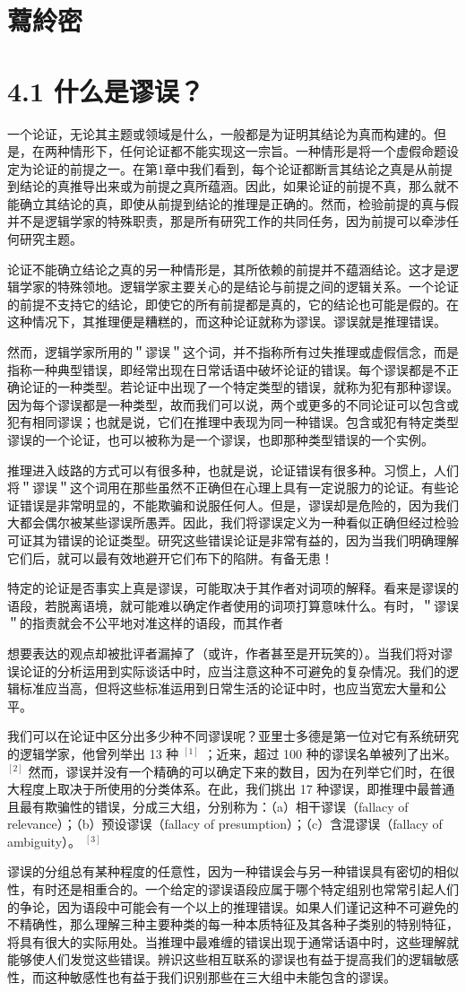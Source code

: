 \section*{藛紷密}
\section*{4.1 什么是谬误？}
一个论证，无论其主题或领域是什么，一般都是为证明其结论为真而构建的。但是，在两种情形下，任何论证都不能实现这一宗旨。一种情形是将一个虚假命题设定为论证的前提之一。在第1章中我们看到，每个论证都断言其结论之真是从前提到结论的真推导出来或为前提之真所蕴涵。因此，如果论证的前提不真，那么就不能确立其结论的真，即使从前提到结论的推理是正确的。然而，检验前提的真与假并不是逻辑学家的特殊职责，那是所有研究工作的共同任务，因为前提可以牵涉任何研究主题。

论证不能确立结论之真的另一种情形是，其所依赖的前提并不蕴涵结论。这才是逻辑学家的特殊领地。逻辑学家主要关心的是结论与前提之间的逻辑关系。一个论证的前提不支持它的结论，即使它的所有前提都是真的，它的结论也可能是假的。在这种情况下，其推理便是糟糕的，而这种论证就称为谬误。谬误就是推理错误。

然而，逻辑学家所用的＂谬误＂这个词，并不指称所有过失推理或虚假信念，而是指称一种典型错误，即经常出现在日常话语中破坏论证的错误。每个谬误都是不正确论证的一种类型。若论证中出现了一个特定类型的错误，就称为犯有那种谬误。因为每个谬误都是一种类型，故而我们可以说，两个或更多的不同论证可以包含或犯有相同谬误；也就是说，它们在推理中表现为同一种错误。包含或犯有特定类型谬误的一个论证，也可以被称为是一个谬误，也即那种类型错误的一个实例。

推理进入歧路的方式可以有很多种，也就是说，论证错误有很多种。习惯上，人们将＂谬误＂这个词用在那些虽然不正确但在心理上具有一定说服力的论证。有些论证错误是非常明显的，不能欺骗和说服任何人。但是，谬误却是危险的，因为我们大都会偶尔被某些谬误所愚弄。因此，我们将谬误定义为一种看似正确但经过检验可证其为错误的论证类型。研究这些错误论证是非常有益的，因为当我们明确理解它们后，就可以最有效地避开它们布下的陷阱。有备无患！

特定的论证是否事实上真是谬误，可能取决于其作者对词项的解释。看来是谬误的语段，若脱离语境，就可能难以确定作者使用的词项打算意味什么。有时，＂谬误＂的指责就会不公平地对准这样的语段，而其作者

想要表达的观点却被批评者漏掉了（或许，作者甚至是开玩笑的）。当我们将对谬误论证的分析运用到实际谈话中时，应当注意这种不可避免的复杂情况。我们的逻辑标准应当高，但将这些标准运用到日常生活的论证中时，也应当宽宏大量和公平。

我们可以在论证中区分出多少种不同谬误呢？亚里士多德是第一位对它有系统研究的逻辑学家，他曾列举出 13 种 ${}^{[1]}$ ；近来，超过 100 种的谬误名单被列了出米。 ${ }^{[2]}$ 然而，谬误并没有一个精确的可以确定下来的数目，因为在列举它们时，在很大程度上取决于所使用的分类体系。在此，我们挑出 17 种谬误，即推理中最普通且最有欺骗性的错误，分成三大组，分别称为：（a）相干谬误（fallacy of relevance）；（b）预设谬误（fallacy of presumption）；（c）含混谬误（fallacy of ambiguity）。 ${}^{[3]}$

谬误的分组总有某种程度的任意性，因为一种错误会与另一种错误具有密切的相似性，有时还是相重合的。一个给定的谬误语段应属于哪个特定组别也常常引起人们的争论，因为语段中可能会有一个以上的推理错误。如果人们谨记这种不可避免的不精确性，那么理解三种主要种类的每一种本质特征及其各种子类别的特别特征，将具有很大的实际用处。当推理中最难缠的错误出现于通常话语中时，这些理解就能够使人们发觉这些错误。辨识这些相互联系的谬误也有益于提高我们的逻辑敏感性，而这种敏感性也有益于我们识别那些在三大组中未能包含的谬误。 